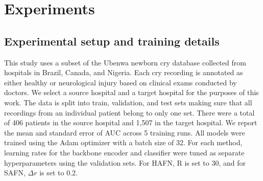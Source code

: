 \documentclass{article}
\begin{document}
\section{Experiments}

\subsection{Experimental setup and training details}
This study uses a subset of the Ubenwa newborn cry database collected from hospitals in Brazil, Canada, and Nigeria. Each cry recording is annotated as either healthy or neurological injury based on clinical exams conducted by doctors. We select a source hospital and a target hospital for the purposes of this work. The data is split into train, validation, and test sets making sure that all recordings from an individual patient belong to only one set. There were a total of 406 patients in the source hospital and 1,507 in the target hospital. We report the mean and standard error of AUC across 5 training runs. All models were trained using the Adam optimizer with a batch size of 32. For each method, learning rates for the backbone encoder and classifier were tuned as separate hyperparameters using the validation sets. For HAFN, R is set to 30, and for SAFN, $\Delta r$ is set to 0.2.



          
\end{document}
